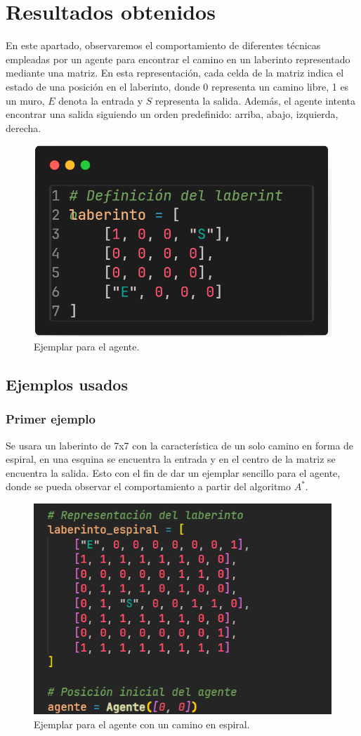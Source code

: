 \section{Resultados obtenidos}

En este apartado, observaremos el comportamiento de diferentes técnicas 
empleadas por un agente para encontrar el camino en un laberinto representado 
mediante una matriz. En esta representación, cada celda de la matriz indica
el estado de una posición en el laberinto, donde 0 representa un camino libre,
1 es un muro, $E$ denota la entrada y $S$ representa la salida. Además,
el agente intenta encontrar una salida siguiendo un orden predefinido: 
arriba, abajo, izquierda, derecha.

\begin{figure}[H]
    \centering
    \includegraphics[width=0.4\linewidth]{IMA/laberintoEjemplo.png} 
    \caption{Ejemplar para el agente.} 
\end{figure}

\subsection*{Ejemplos usados}

\subsubsection*{Primer ejemplo}

Se usara un laberinto de 7x7 con la característica de un solo camino en forma
de espiral, en una esquina se encuentra la entrada y en el centro de la matriz se encuentra la salida.
Esto con el fin de dar un ejemplar sencillo para el agente, donde se pueda observar el comportamiento 
a partir del algoritmo $A^{*}$.

\begin{figure}[H]
    \centering
    \includegraphics[width=0.5\linewidth]{IMA/Laberinto1.png} 
    \caption{Ejemplar para el agente con un camino en espiral.} 
    \label{fig:ejemplo} 
\end{figure}

